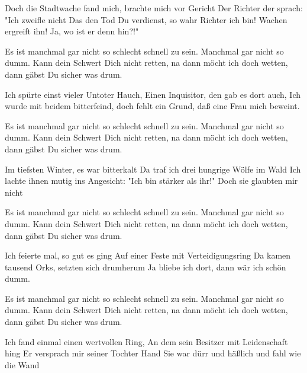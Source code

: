     \beginverse\replay[verse]
        Doch die Stadtwache fand mich, brachte mich vor Gericht
        Der Richter der sprach: "Ich zweifle nicht
        Das den Tod Du verdienst, so wahr Richter ich bin!
        Wachen ergreift ihn! Ja, wo ist er denn hin?!"
    \endverse

    \beginchorus\replay[chorus]
        Es ist manchmal gar nicht so schlecht schnell zu sein.
        Manchmal gar nicht so dumm.
        Kann dein Schwert Dich nicht retten,
        na dann möcht ich doch wetten, dann gäbst Du sicher was drum.
    \endchorus

    \beginverse\replay[verse]
        Ich spürte einst vieler Untoter Hauch,
        Einen Inquisitor, den gab es dort auch,
        Ich wurde mit beidem bitterfeind,
        doch fehlt ein Grund, daß eine Frau mich beweint.
    \endverse

    \beginchorus\replay[chorus]
        Es ist manchmal gar nicht so schlecht schnell zu sein.
        Manchmal gar nicht so dumm.
        Kann dein Schwert Dich nicht retten,
        na dann möcht ich doch wetten, dann gäbst Du sicher was drum.
    \endchorus

    \beginverse\replay[verse]
        Im tiefsten Winter, es war bitterkalt
        Da traf ich drei hungrige Wölfe im Wald
        Ich lachte ihnen mutig ins Angesicht:
        "Ich bin stärker als ihr!" Doch sie glaubten mir nicht
    \endverse

    \beginchorus\replay[chorus]
        Es ist manchmal gar nicht so schlecht schnell zu sein.
        Manchmal gar nicht so dumm.
        Kann dein Schwert Dich nicht retten,
        na dann möcht ich doch wetten, dann gäbst Du sicher was drum.
    \endchorus

    \beginverse\replay[verse]
        Ich feierte mal, so gut es ging
        Auf einer Feste mit Verteidigungsring
        Da kamen tausend Orks, setzten sich drumherum
        Ja bliebe ich dort, dann wär ich schön dumm.
    \endverse

    \beginchorus\replay[chorus]
        Es ist manchmal gar nicht so schlecht schnell zu sein.
        Manchmal gar nicht so dumm.
        Kann dein Schwert Dich nicht retten,
        na dann möcht ich doch wetten, dann gäbst Du sicher was drum.
    \endchorus

    \beginverse\replay[verse]
        Ich fand einmal einen wertvollen Ring,
        An dem sein Besitzer mit Leidenschaft hing
        Er versprach mir seiner Tochter Hand
        Sie war dürr und häßlich und fahl wie die Wand
    \endverse

